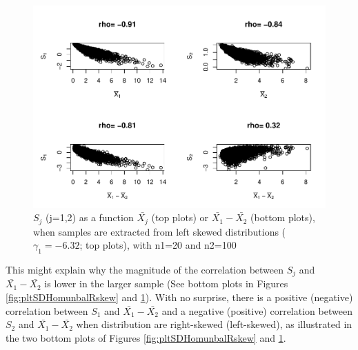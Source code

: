 \documentclass[
  man]{apa6}
\begin{document}
\begin{figure}
\centering
\includegraphics{Correlations-between-the-sample-means-difference-and-standardizers-of-all-estimators,-and-implications-on-biases-and-variances-of-all-estimators_files/figure-latex/pltSDHomunbalLskew-1.pdf}
\caption{\label{fig:pltSDHomunbalLskew}\(S_j\) (j=1,2) as a function \(\bar{X_j}\) (top plots) or \(\bar{X_1}-\bar{X_2}\) (bottom plots), when samples are extracted from left skewed distributions (\(\gamma_1 = -6.32\); top plots), with n1=20 and n2=100}
\end{figure}

This might explain why the magnitude of the correlation between \(S_j\) and \(\bar{X_1}-\bar{X_2}\) is lower in the larger sample (See bottom plots in Figures \ref{fig:pltSDHomunbalRskew} and \ref{fig:pltSDHomunbalLskew}). With no surprise, there is a positive (negative) correlation between \(S_1\) and \(\bar{X_1}-\bar{X_2}\) and a negative (positive) correlation between \(S_2\) and \(\bar{X_1}-\bar{X_2}\) when distribution are right-skewed (left-skewed), as illustrated in the two bottom plots of Figures \ref{fig:pltSDHomunbalRskew} and \ref{fig:pltSDHomunbalLskew}.
\end{document}
